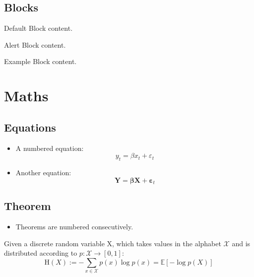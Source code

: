 \documentclass[
14pt,notheorems,hyperref={pdfauthor=whatever}
]{beamer}
\begin{document}
\subsection{Blocks}
\begin{frame}

   \centering
	\begin{minipage}[b]{0.5\textwidth}

	  \begin{block}{Default}
        Block content.
      \end{block}

      \begin{alertblock}{Alert}
        Block content.
      \end{alertblock}

      \begin{exampleblock}{Example}
        Block content.
      \end{exampleblock}      
      
	\end{minipage}	
\end{frame}

\section{Maths}
\subsection{Equations}
\begin{frame}
    \begin{itemize}
        \item A numbered equation:
        \begin{equation}
            y_t = \beta x_t + \varepsilon_t
        \end{equation}
         \item Another equation:
        \begin{equation*}
            \mathbf{Y} = \boldsymbol{\beta} \mathbf{X} + \boldsymbol{\varepsilon}_t
        \end{equation*}
    \end{itemize}
\end{frame}

\subsection{Theorem}
\begin{frame}
    \begin{itemize}
        \item Theorems are numbered consecutively.
    \end{itemize}
    \begin{theorem}
         Given a discrete random variable X, which takes values in the alphabet $\mathcal{X}$ and is distributed according to  $p:{\mathcal {X}}\to [0,1]$:
            \begin{equation}
                \mathrm {H} (X):=-\sum _{x\in {\mathcal {X}}}p(x)\log p(x)=\mathbb {E} [-\log p(X)]
            \end{equation}
    \end{theorem}
\end{frame}
\end{document}
